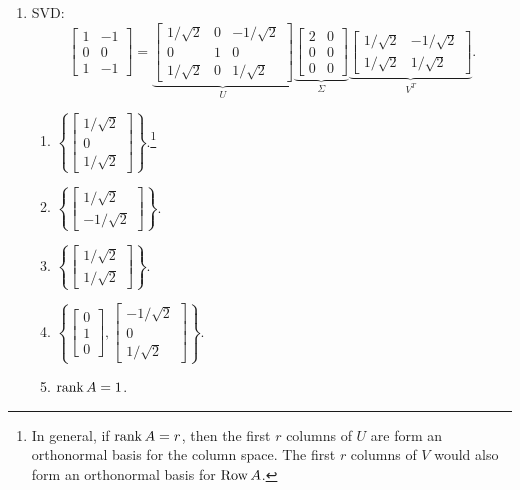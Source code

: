 \begin{enumerate}
	\item SVD: \[\begin{bmatrix}1 & -1 \\ 0 & 0 \\ 1 & -1\end{bmatrix} = \underbrace{\begin{bmatrix}1/\sqrt{2} & 0  & -1/\sqrt{2} \\ 0 & 1 & 0 \\ 1/\sqrt{2} & 0 & 1/\sqrt{2}\end{bmatrix}}_U \underbrace{\begin{bmatrix}2 & 0 \\ 0 & 0 \\ 0 & 0\end{bmatrix}}_\Sigma\underbrace{\begin{bmatrix}1/\sqrt{2} & -1/\sqrt{2} \\ 1/\sqrt{2} & 1/\sqrt{2}\end{bmatrix}}_{V^T}.\]
		\begin{enumerate}
			\item \(\left\{ \begin{bmatrix}1/\sqrt{2} \\ 0 \\ 1/\sqrt{2}\end{bmatrix} \right\}\).\footnote{In general, if \(\operatorname{rank} A = r\), then the first \(r\)
				 columns of \(U\) are form an orthonormal basis for the column space. The first \(r\) columns of \(V\) would also form an orthonormal
				 basis for \(\operatorname{Row} A\).}
			\item \(\left\{ \begin{bmatrix}1/\sqrt{2} \\ -1/\sqrt{2}\end{bmatrix} \right\}\).
			\item \(\left\{ \begin{bmatrix}1/\sqrt{2} \\ 1/\sqrt{2}\end{bmatrix} \right\}\).
			\item \(\left\{ \begin{bmatrix}0 \\ 1 \\ 0\end{bmatrix},  \begin{bmatrix}-1/\sqrt{2} \\ 0 \\ 1/\sqrt{2}\end{bmatrix}\right\}\).
			\item \(\operatorname{rank} A = 1\).

\end{enumerate}
\end{enumerate}
